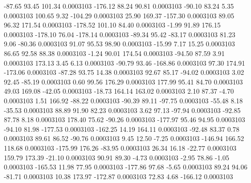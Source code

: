       -87.65       93.45      101.34     0.0003103
     -176.12       88.24       90.81     0.0003103
      -90.10       83.24        5.35     0.0003103
      100.65        9.32     -104.29     0.0003103
       25.90      169.37     -157.30     0.0003103
       89.05       96.32      171.54     0.0003103
     -178.52      101.10       84.40     0.0003103
       -1.99       91.89      176.15     0.0003103
     -178.10       76.04     -178.14     0.0003103
      -89.34       95.42      -83.17     0.0003103
       81.23        9.06      -80.36     0.0003103
       91.07       95.53       98.90     0.0003103
      -15.99        7.17       15.25     0.0003103
       86.65       92.58       88.38     0.0003103
       -1.24       90.01      174.54     0.0003103
      -94.50       87.59        3.91     0.0003103
      173.13        3.45        6.13     0.0003103
      -90.79       93.46     -168.86     0.0003103
       97.30      174.91     -173.06     0.0003103
      -87.28       93.75       14.38     0.0003103
       92.67       85.17      -94.02     0.0003103
        3.02       92.45      -85.19     0.0003103
        0.60       99.56      176.29     0.0003103
      177.99       95.41       84.70     0.0003103
       49.03      169.08      -42.05     0.0003103
      -18.73      164.14      163.02     0.0003103
        2.10       87.37       -4.70     0.0003103
        1.51      166.92      -88.22     0.0003103
      -90.39       89.11      -97.75     0.0003103
      -55.48        8.18      -35.53     0.0003103
       88.89       91.90       82.23     0.0003103
        3.62       97.13      -97.94     0.0003103
      -92.85       87.78        8.18     0.0003103
      178.40       75.62      -90.26     0.0003103
     -177.97       95.46       94.95     0.0003103
      -94.10       81.98     -177.53     0.0003103
     -162.25       14.19      164.11     0.0003103
      -92.48       83.37        0.78     0.0003103
       89.61       86.52      -90.76     0.0003103
        9.45       12.50       -7.25     0.0003103
     -146.94      166.52      118.68     0.0003103
     -175.99      176.26      -83.95     0.0003103
       26.34       16.18      -22.77     0.0003103
      159.79      173.39      -21.10     0.0003103
       90.91       89.30       -4.73     0.0003103
       -2.95       78.86       -1.05     0.0003103
     -165.53       11.98       77.95     0.0003103
     -177.86       97.68       -5.65     0.0003103
       89.24       94.06      -81.71     0.0003103
       10.38      173.97     -172.87     0.0003103
       72.83        4.68     -166.12     0.0003103
